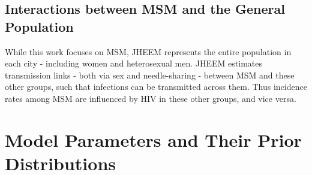 \documentclass{article}
\begin{document}
\subsection{Interactions between MSM and the General Population}
While this work focuses on MSM, JHEEM represents the entire population in each city - including women and heterosexual men. JHEEM estimates transmission links - both via sex and needle-sharing - between MSM and these other groups, such that infections can be transmitted across them. Thus incidence rates among MSM are influenced by HIV in these other groups, and vice versa.


\newpage
\section{Model Parameters and Their Prior Distributions}
\tabulinesep=2pt
\end{document}
